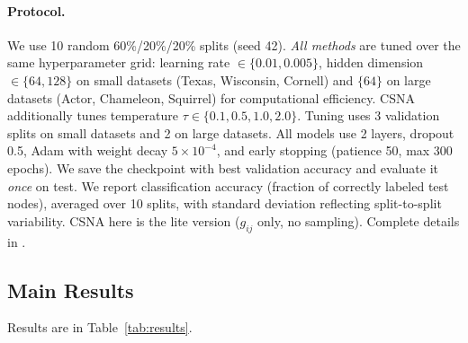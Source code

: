 \documentclass[runningheads]{llncs}
\begin{document}
\paragraph{Protocol.}
We use 10 random 60\%/20\%/20\% splits (seed 42).
\emph{All methods} are tuned over the same hyperparameter grid: learning rate $\in \{0.01, 0.005\}$, hidden dimension $\in \{64, 128\}$ on small datasets (Texas, Wisconsin, Cornell) and $\{64\}$ on large datasets (Actor, Chameleon, Squirrel) for computational efficiency.
CSNA additionally tunes temperature $\tau \in \{0.1, 0.5, 1.0, 2.0\}$.
Tuning uses 3 validation splits on small datasets and 2 on large datasets.
All models use 2 layers, dropout 0.5, Adam with weight decay $5 \times 10^{-4}$, and early stopping (patience 50, max 300 epochs).
We save the checkpoint with best validation accuracy and evaluate it \emph{once} on test.
We report classification accuracy (fraction of correctly labeled test nodes), averaged over 10 splits, with standard deviation reflecting split-to-split variability.
CSNA here is the lite version ($g_{ij}$ only, no sampling).
Complete details in .

\subsection{Main Results}

Results are in Table~\ref{tab:results}.
\end{document}
